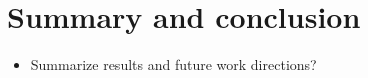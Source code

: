 \section{Summary and conclusion}
\begin{itemize}
    \item Summarize results and future work directions?
\end{itemize}
